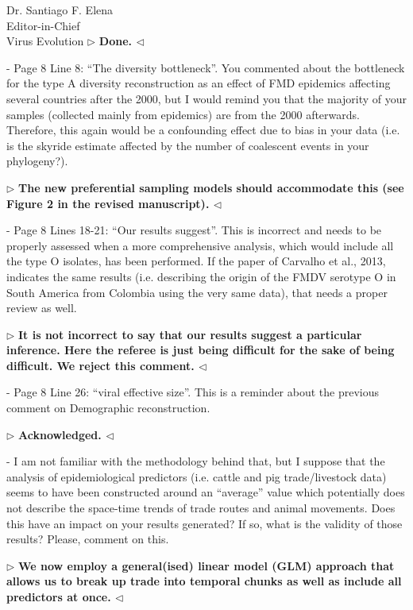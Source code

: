 \documentclass[ucla,biomath,12pt,noaddrfooter,datefrom]{UC_letter}
\newenvironment{reply}{$\triangleright$\bf}{$\triangleleft$}
\begin{document}
\begin{letter}{
Dr. Santiago F. Elena \\
Editor-in-Chief \\
Virus Evolution
}
\begin{reply}
Done.
\end{reply}

-       Page 8 Line 8: ``The diversity bottleneck''. 
You commented about the bottleneck for the type A diversity reconstruction as an effect of FMD epidemics affecting several countries after the 2000, but I would remind you that the majority of your samples (collected mainly from epidemics) are from the 2000 afterwards. 
Therefore, this again would be a confounding effect due to bias in your data (i.e. is the skyride estimate affected by the number of coalescent events in your phylogeny?).

\begin{reply}
The new preferential sampling models should accommodate this (see Figure 2 in the revised manuscript).
\end{reply}

-       Page 8 Lines 18-21: ``Our results suggest''. 
This is incorrect and needs to be properly assessed when a more comprehensive analysis, which would include all the type O isolates, has been performed. 
If the paper of Carvalho et al., 2013, indicates the same results (i.e. describing the origin of the FMDV serotype O in South America from Colombia using the very same data), that needs a proper review as well.

\begin{reply}
It is not incorrect to say that our results suggest a particular inference. 
Here the referee is just being difficult for the sake of being difficult.
We reject this comment.
\end{reply}

-       Page 8 Line 26: ``viral effective size''. 
This is a reminder about the previous comment on Demographic reconstruction.

\begin{reply}
Acknowledged.
\end{reply}

-       I am not familiar with the methodology behind that, but I suppose that the analysis of epidemiological predictors (i.e. cattle and pig trade/livestock data) seems to have been constructed around an ``average'' value which potentially does not describe the space-time trends of trade routes and animal movements. 
Does this have an impact on your results generated? 
If so, what is the validity of those results? Please, comment on this.

\begin{reply}
We now employ a general(ised) linear model (GLM) approach that allows us to break up trade into temporal chunks as well as include all predictors at once. 
\end{reply}


\end{letter}
\end{document}
